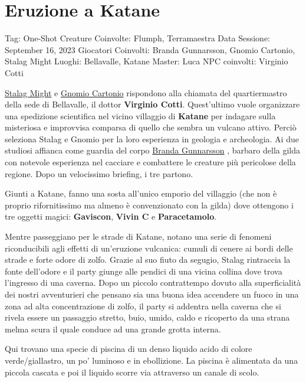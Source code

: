 \section{Eruzione a Katane}\label{eruzione-a-katane}

Tag: One-Shot Creature Coinvolte: Flumph, Terramaestra Data Sessione:
September 16, 2023 Giocatori Coinvolti: Branda Gunnarsson, Gnomio
Cartonio, Stalag Might Luoghi: Bellavalle, Katane Master: Luca NPC
coinvolti: Virginio Cotti

\href{Stalag\%20Might\%2082c32b9a749a4543aae2e78474794fe6.md}{Stalag
Might} e
\href{Gnomio\%20Cartonio\%20765b9ff9da1e49eb8401026d43d749a9.md}{Gnomio
Cartonio} rispondono alla chiamata del quartiermastro della sede di
Bellavalle, il dottor \textbf{Virginio Cotti}. Quest'ultimo vuole
organizzare una spedizione scientifica nel vicino villaggio di
\textbf{Katane} per indagare sulla misteriosa e improvvisa comparsa di
quello che sembra un vulcano attivo. Perciò seleziona Stalag e Gnomio
per la loro esperienza in geologia e archeologia. Ai due studiosi
affianca come guardia del corpo
\href{Branda\%20Gunnarsson\%20f8c7d7de2863418e9d8a94419f4b2d74.md}{Branda
Gunnarsson} , barbaro della gilda con notevole esperienza nel cacciare e
combattere le creature più pericolose della regione. Dopo un velocissimo
briefing, i tre partono.

Giunti a Katane, fanno una sosta all'unico emporio del villaggio (che
non è proprio rifornitissimo ma almeno è convenzionato con la gilda)
dove ottengono i tre oggetti magici: \textbf{Gaviscon}, \textbf{Vivin C}
e \textbf{Paracetamolo}.

Mentre passeggiano per le strade di Katane, notano una serie di fenomeni
riconducibili agli effetti di un'eruzione vulcanica: cumuli di cenere ai
bordi delle strade e forte odore di zolfo. Grazie al suo fiuto da
segugio, Stalag rintraccia la fonte dell'odore e il party giunge alle
pendici di una vicina collina dove trova l'ingresso di una caverna. Dopo
un piccolo contrattempo dovuto alla superficialità dei nostri
avventurieri che pensano sia una buona idea accendere un fuoco in una
zona ad alta concentrazione di zolfo, il party si addentra nella caverna
che si rivela essere un passaggio stretto, buio, umido, caldo e
ricoperto da una strana melma scura il quale conduce ad una grande
grotta interna.

Qui trovano una specie di piscina di un denso liquido acido di colore
verde/giallastro, un po' luminoso e in ebollizione. La piscina è
alimentata da una piccola cascata e poi il liquido scorre via attraverso
un canale di scolo.

